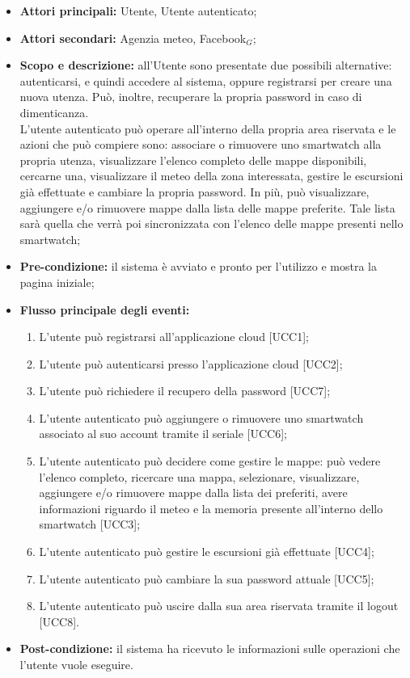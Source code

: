 \begin{itemize}
\item \textbf{Attori principali:} Utente, Utente autenticato;
\item \textbf{Attori secondari:} Agenzia meteo, Facebook$_{G}$;
\item \textbf{Scopo e descrizione:} all'Utente sono presentate due possibili alternative: autenticarsi, e quindi accedere al sistema, oppure registrarsi per creare una nuova utenza. Può, inoltre, recuperare la propria password in caso di dimenticanza.\\ 
L’utente autenticato può operare all’interno della propria area riservata e le azioni che può compiere sono: associare o rimuovere uno smartwatch alla propria utenza, visualizzare l'elenco completo delle mappe disponibili, cercarne una, visualizzare il meteo della zona interessata, gestire le escursioni già effettuate e cambiare la propria password. In più, può visualizzare, aggiungere e/o rimuovere mappe dalla lista delle mappe preferite. Tale lista sarà quella che verrà poi sincronizzata con l'elenco delle mappe presenti nello smartwatch;
\item \textbf{Pre-condizione:} il sistema è avviato e pronto per l'utilizzo e mostra la pagina iniziale; 
\item \textbf{Flusso principale degli eventi:} 
\begin{enumerate}
\item L’utente può registrarsi all’applicazione cloud [UCC1];
\item L’utente può autenticarsi presso l’applicazione cloud [UCC2];
\item L'utente può richiedere il recupero della password [UCC7];
\item L’utente autenticato può aggiungere o rimuovere uno smartwatch associato al suo account tramite il seriale [UCC6];
\item L’utente autenticato può decidere come gestire le mappe: può vedere l'elenco completo, ricercare una mappa, selezionare, visualizzare, aggiungere e/o rimuovere mappe dalla lista dei preferiti, avere informazioni riguardo il meteo e la memoria presente all'interno dello smartwatch [UCC3];
\item L’utente autenticato può gestire le escursioni già effettuate [UCC4];
\item L'utente autenticato può cambiare la sua password attuale [UCC5];
\item L'utente autenticato può uscire dalla sua area riservata tramite il logout [UCC8].
\end{enumerate}
\item \textbf{Post-condizione:} il sistema ha ricevuto le informazioni sulle operazioni che l’utente vuole eseguire.
\end{itemize}


